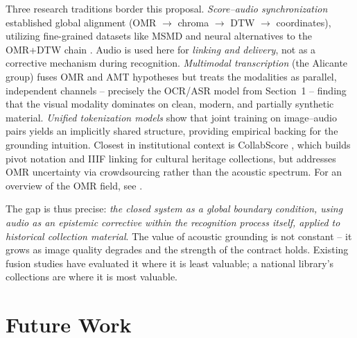 \documentclass[11pt,a4paper]{article}
\begin{document}
Three research traditions border this proposal. \emph{Score--audio synchronization} \cite{thomas2012,muller2021fmp} established global alignment (OMR $\rightarrow$ chroma $\rightarrow$ DTW $\rightarrow$ coordinates), utilizing fine-grained datasets like MSMD \cite{dorfer2018} and neural alternatives to the OMR+DTW chain \cite{henkel2021}. Audio is used here for \emph{linking and delivery}, not as a corrective mechanism during recognition. \emph{Multimodal transcription} (the Alicante group) \cite{delafuente2022,alfaro2023,alfaro2026} fuses OMR and AMT hypotheses but treats the modalities as parallel, independent channels -- precisely the OCR/ASR model from Section~1 -- finding that the visual modality dominates on clean, modern, and partially synthetic material. \emph{Unified tokenization models} \cite{unified2025} show that joint training on image--audio pairs yields an implicitly shared structure, providing empirical backing for the grounding intuition. Closest in institutional context is CollabScore \cite{rigaux2024}, which builds pivot notation and IIIF linking for cultural heritage collections, but addresses OMR uncertainty via crowdsourcing rather than the acoustic spectrum. For an overview of the OMR field, see \cite{calvozaragoza2020}.

The gap is thus precise: \emph{the closed system as a global boundary condition, using audio as an epistemic corrective within the recognition process itself, applied to historical collection material}. The value of acoustic grounding is not constant -- it grows as image quality degrades and the strength of the contract holds. Existing fusion studies have evaluated it where it is least valuable; a national library's collections are where it is most valuable.

\section{Future Work}
\end{document}
